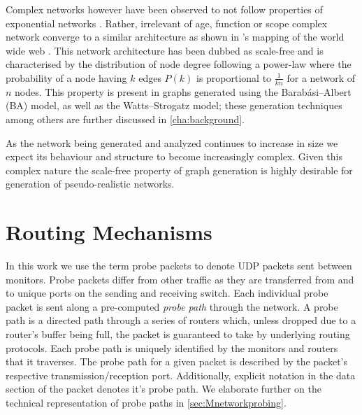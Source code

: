 Complex networks however have been observed to not follow properties of exponential networks . Rather, irrelevant of age, function or scope complex network converge to a similar architecture as shown in \cite{albert_diameter_1999}’s mapping of the world wide web . This network architecture has been dubbed as scale-free and is characterised by the distribution of node degree following a power-law where the probability of a node having $k$ edges $P(k)$  is proportional to $\frac{1}{kn}$ for a network of $n$ nodes. This property is present in graphs generated using the Barabási–Albert (BA) model, as well as the Watts–Strogatz model; these generation techniques among others are further discussed in \cref{cha:background}.\par
As the network being generated and analyzed continues to increase in size we expect its behaviour and structure to become increasingly complex. Given this complex nature the scale-free property of graph generation is highly desirable for generation of pseudo-realistic networks.

\section{Routing Mechanisms}
\label{sec:Broutingmechanisms}

    In this work we use the term probe packets to denote UDP packets sent between monitors. Probe packets differ from other traffic as they are transferred from and to unique ports on the sending and receiving switch. Each individual probe packet is sent along a pre-computed \emph{probe path} through the network. A probe path is a directed path through a series of routers which, unless dropped due to a router's buffer being full, the packet is guaranteed to take by underlying routing protocols. Each probe path is uniquely identified by the monitors and routers that it traverses. The probe path for a given packet is described by the packet's respective transmission/reception port. Additionally, explicit notation in the data section of the packet denotes it's probe path. We elaborate further on the technical representation of probe paths in \cref{sec:Mnetworkprobing}.\par
    

